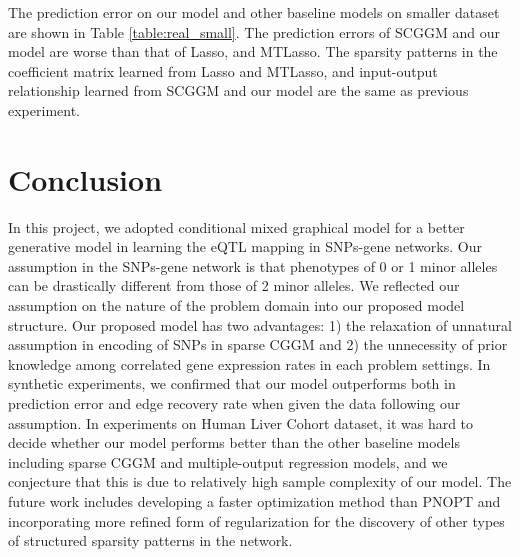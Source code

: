 \documentclass{article}
\begin{document}
The prediction error on our model and other baseline models on smaller dataset are shown in Table \ref{table:real_small}. The prediction errors of SCGGM and our model are worse than that of Lasso, and MTLasso. The sparsity patterns in the coefficient matrix learned from Lasso and MTLasso, and input-output relationship learned from SCGGM and our model are the same as previous experiment. 



\section{Conclusion}
\label{Conclusion}
In this project, we adopted conditional mixed graphical model for a better generative model in learning the eQTL mapping in SNPs-gene networks. Our assumption in the SNPs-gene network is that phenotypes of 0 or 1 minor alleles can be drastically different from those of 2 minor alleles. We reflected our assumption on the nature of the problem domain into our proposed model structure. Our proposed model has two advantages: 1) the relaxation of unnatural assumption in encoding of SNPs in sparse CGGM and 2) the unnecessity of prior knowledge among correlated gene expression rates in each problem settings. In synthetic experiments, we confirmed that our model outperforms both in prediction error and edge recovery rate when given the data following our assumption. In experiments on Human Liver Cohort dataset, it was hard to decide whether our model performs better than the other baseline models including sparse CGGM and multiple-output regression models, and we conjecture that this is due to relatively high sample complexity of our model. The future work includes developing a faster optimization method than PNOPT and incorporating more refined form of regularization for the discovery of other types of structured sparsity patterns in the network.





\nocite{*}


\end{document}
